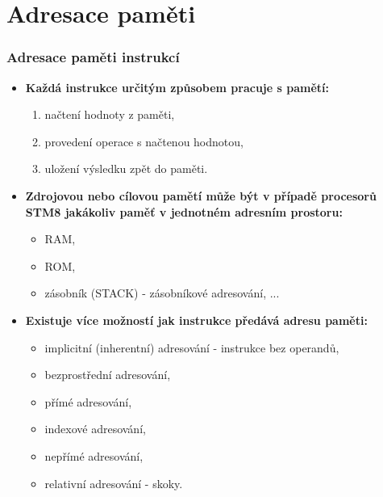 \section{\texorpdfstring{Adresace paměti}{Adresace pameti}}

	\begin{frame}
    \frametitle{Adresace paměti instrukcí}
		\small
		
		\begin{itemize}
			\item \textbf{Každá instrukce určitým způsobem pracuje s pamětí:}
			
			\begin{enumerate}
				\item načtení hodnoty z paměti,
				\item provedení operace s načtenou hodnotou,
				\item uložení výsledku zpět do paměti.
			\end{enumerate}
			
			\vspace{1mm}
			\item \textbf{Zdrojovou nebo cílovou pamětí může být v případě procesorů STM8 jakákoliv paměť v jednotném adresním prostoru:}
			
			\begin{itemize}
				\item RAM,
				\item ROM,
				\item zásobník (STACK) -  zásobníkové adresování, ...
			\end{itemize}
			
			\vspace{1mm}
			\item \textbf{Existuje více možností jak instrukce předává adresu paměti:}
			
			\begin{itemize}
				\item implicitní (inherentní) adresování - instrukce bez operandů,
				\item bezprostřední adresování,
				\item přímé adresování,
				\item indexové adresování,
				\item nepřímé adresování,
				\item relativní adresování - skoky.
			\end{itemize}
		\end{itemize}

	\end{frame}
	

